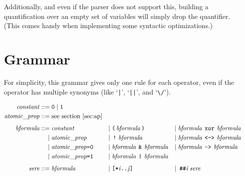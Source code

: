 \documentclass[a4paper,twoside,10pt,DIV=12]{scrreprt}
\DeclareMathOperator{\NOT}{\texttt{!}}
\newcommand{\XOR}{\mathbin{\texttt{xor}}}
\newcommand{\IMPLIES}{\mathbin{\texttt{->}}}
\newcommand{\EQUIV}{\mathbin{\texttt{<->}}}
\newcommand{\OR}{\mathbin{\texttt{|}}}
\newcommand{\AND}{\mathbin{\texttt{\&}}}
\newcommand{\DELAY}[1]{\mathbin{\texttt{\#\##1}}}
\newcommand{\0}{\texttt{0}}
\newcommand{\1}{\texttt{1}}
\newcommand{\STAR}[1]{\texttt{[*#1]}}
\newcommand\mvar[1]{\ensuremath{\mathit{#1}}}
\newcommand\code[1]{\texttt{#1}}
\newcommand\samp[1]{`\texttt{#1}'}
\newcommand\tsamp[1]{\text{\texttt{#1}}}
\newcommand\msamp[1]{#1}
\begin{document}
Additionally, and even if the parser does not support this, building a
quantification over an empty set of variables will simply drop the
quantifier.  (This comes handy when implementing some syntactic
optimizations.)

\chapter{Grammar}

For simplicity, this grammar gives only one rule for each
operator, even if the operator has multiple synonyms (like \samp{|},
\samp{||}, and {`\verb=\/='}).

\begin{align*}
\mathit{constant} ::={}     & \0 \mid \1                                                                                                                                                                                                       \\
\mathit{atomic\_prop} ::={} & \text{see section~\ref{sec:ap}}                                                                                                                                                                                     \\[1ex]
  \mathit{bformula} ::={}   & \mathit{constant}                                      & \mid{} & \tsamp{(}\,\mathit{bformula}\,\tsamp{)}                    & \mid{} & \mathit{bformula}\,\msamp{\XOR}\,\mathit{bformula}                       \\
  \mid{}                    & \mathit{atomic\_prop}                                  & \mid{} & \msamp{\NOT}\,\mathit{bformula}                            & \mid{} & \mathit{bformula}\,\msamp{\EQUIV}\,\mathit{bformula}                     \\
  \mid{}                    & \mathit{atomic\_prop}\code{=0}                         & \mid{} & \mathit{bformula}\,\msamp{\AND}\,\mathit{bformula}         & \mid{} & \mathit{bformula}\,\msamp{\IMPLIES}\,\mathit{bformula}                   \\
  \mid{}                    & \mathit{atomic\_prop}\code{=1}                         & \mid{} & \mathit{bformula}\,\msamp{\OR}\,\mathit{bformula}                                                                                              \\[1ex]
\mathit{sere} ::={}         & \mathit{bformula}                                      & \mid{} & \msamp{\STAR{\mvar{i}..\mvar{j}}}                          & \mid{} & \DELAY{\mvar{i}}\mathit{sere}                                            \\

\end{align*}
\end{document}
